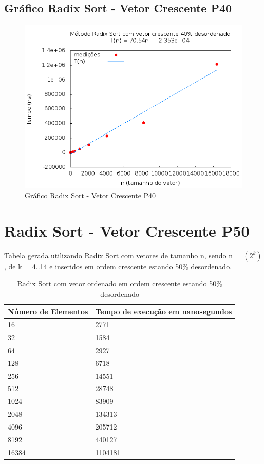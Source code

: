 \documentclass[12pt,a4paper,twoside]{report}
\begin{document}
\subsection{Gráfico Radix Sort - Vetor Crescente P40}
\begin{figure}[H]
    \centering
    \includegraphics[width=0.7\linewidth]{graficos/RadixSort/vIntCrescenteP40/vIntCrescenteP40.png}
  \caption{Gráfico Radix Sort - Vetor Crescente P40}
\end{figure}

\section{Radix Sort - Vetor Crescente P50}
Tabela gerada utilizando Radix Sort com vetores de tamanho n, sendo n = $(2^k)$, de k = 4..14 e inseridos em ordem crescente estando 50\% desordenado.
\begin{table}[H]
\centering
\caption{Radix Sort com vetor ordenado em ordem crescente estando 50\% desordenado}
\label{my-label}
\begin{tabular}{|l|l|}
\hline
\multicolumn{1}{|c|}{\textbf{Número de Elementos}} & \multicolumn{1}{c|}{\textbf{Tempo de execução em nanosegundos}} \\ \hline
16 & 2771 \\ \hline
32 & 1584 \\ \hline
64 & 2927 \\ \hline
128 & 6718 \\ \hline
256 & 14551 \\ \hline
512 & 28748 \\ \hline
1024 & 83909 \\ \hline
2048 & 134313 \\ \hline
4096 & 205712 \\ \hline
8192 & 440127 \\ \hline
16384 & 1104181 \\ \hline
\end{tabular}
\end{table}
\end{document}
